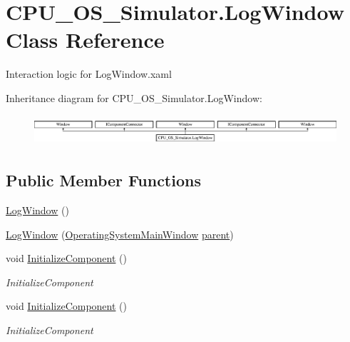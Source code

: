 \hypertarget{class_c_p_u___o_s___simulator_1_1_log_window}{}\section{C\+P\+U\+\_\+\+O\+S\+\_\+\+Simulator.\+Log\+Window Class Reference}
\label{class_c_p_u___o_s___simulator_1_1_log_window}


Interaction logic for Log\+Window.\+xaml  


Inheritance diagram for C\+P\+U\+\_\+\+O\+S\+\_\+\+Simulator.\+Log\+Window\+:\begin{figure}[H]
\begin{center}
\leavevmode
\includegraphics[height=1.131313cm]{class_c_p_u___o_s___simulator_1_1_log_window}
\end{center}
\end{figure}
\subsection*{Public Member Functions}
\begin{DoxyCompactItemize}
\item 
\hyperlink{class_c_p_u___o_s___simulator_1_1_log_window_a364c2f1eeb91fbf4b00b6d252b145304}{Log\+Window} ()
\item 
\hyperlink{class_c_p_u___o_s___simulator_1_1_log_window_ae6e4e2c099f86efa4de3272eb732756a}{Log\+Window} (\hyperlink{class_c_p_u___o_s___simulator_1_1_operating_system_main_window}{Operating\+System\+Main\+Window} \hyperlink{class_c_p_u___o_s___simulator_1_1_log_window_a72c3ad97eb5e6551a174ddf92961aecb}{parent})
\item 
void \hyperlink{class_c_p_u___o_s___simulator_1_1_log_window_a07dde98a6a084f12822540d2a90f6ae3}{Initialize\+Component} ()
\begin{DoxyCompactList}\small\item\em Initialize\+Component \end{DoxyCompactList}\item 
void \hyperlink{class_c_p_u___o_s___simulator_1_1_log_window_a07dde98a6a084f12822540d2a90f6ae3}{Initialize\+Component} ()
\begin{DoxyCompactList}\small\item\em Initialize\+Component \end{DoxyCompactList}\end{DoxyCompactItemize}
